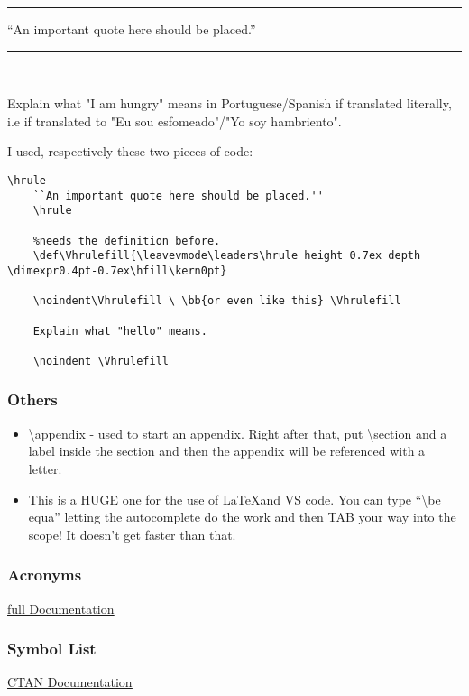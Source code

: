 \hrule
``An important quote here should be placed.''
\hrule
\vspace{1cm}
\noindent\Vhrulefill \  \Vhrulefill

Explain what "I am hungry" means in Portuguese/Spanish if translated literally, i.e if translated to "Eu sou esfomeado"/"Yo soy hambriento".

\noindent \Vhrulefill
\vspace{.5cm}

I used, respectively these two pieces of code:
\begin{lstlisting}[language = Tex]
    \hrule
    ``An important quote here should be placed.''
    \hrule

    %needs the definition before.
    \def\Vhrulefill{\leavevmode\leaders\hrule height 0.7ex depth \dimexpr0.4pt-0.7ex\hfill\kern0pt}

    \noindent\Vhrulefill \ \bb{or even like this} \Vhrulefill

    Explain what "hello" means.

    \noindent \Vhrulefill

\end{lstlisting}


\subsubsection{Others}
\begin{itemize}
    \item \textbackslash appendix - used to start an appendix. Right after that, put \textbackslash section and a label inside the section and then the appendix will be referenced with a letter.
    \item This is a HUGE one for the use of \LaTeX and VS code. You can type ``\textbackslash be equa'' letting the autocomplete do the work and then TAB your way into the scope! It doesn't get faster than that.
\end{itemize}

\subsubsection{Acronyms}
\href{http://mirrors.up.pt/pub/CTAN/macros/latex/contrib/acro/acro_en.pdf}{\ul{full Documentation}}

\subsubsection{Symbol List}
\href{https://personal.utdallas.edu/~hamlen/symlist.pdf}{\ul{CTAN Documentation}}

